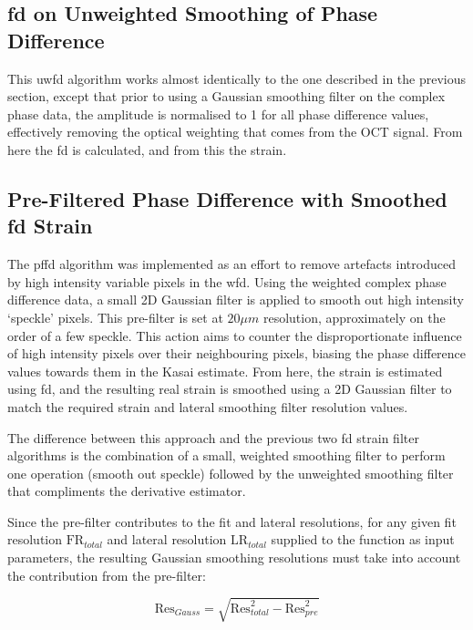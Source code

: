 \subsection{\ac{fd} on Unweighted Smoothing of Phase Difference}
This \ac{uwfd} algorithm works almost identically to the one described in the previous section, except that prior to using a Gaussian smoothing filter on the complex phase data, the amplitude is normalised to 1 for all phase difference values, effectively removing the optical weighting that comes from the OCT signal. From here the \ac{fd} is calculated, and from this the strain. 

\subsection{Pre-Filtered Phase Difference with Smoothed \ac{fd} Strain}

The \ac{pffd} algorithm was implemented as an effort to remove artefacts introduced by high intensity variable pixels in the \ac{wfd}. Using the weighted complex phase difference data, a small 2D Gaussian filter is applied to smooth out high intensity `speckle' pixels. This pre-filter is set at $20 \mu m$ resolution, approximately on the order of a few speckle. 
This action aims to counter the disproportionate influence of high intensity pixels over their neighbouring pixels, biasing the phase difference values towards them in the Kasai estimate. 
From here, the strain is estimated using \ac{fd}, and the resulting real strain is smoothed using a 2D Gaussian filter to match the required strain and lateral smoothing filter resolution values. 

The difference between this approach and the previous two \ac{fd} strain filter algorithms is the combination of a small, weighted smoothing filter to perform one operation (smooth out speckle) followed by the unweighted smoothing filter that compliments the derivative estimator.

Since the pre-filter contributes to the fit and lateral resolutions, for any given fit resolution $\text{FR}_{total}$ and lateral resolution $\text{LR}_{total}$ supplied to the function as input parameters, the resulting Gaussian smoothing resolutions must take into account the contribution from the pre-filter:

\begin{equation}
	\text{Res}_{Gauss} = \sqrt{\text{Res}_{total}^2 - \text{Res}_{pre}^2}
    \label{prefilter_res_FR}
\end{equation}

